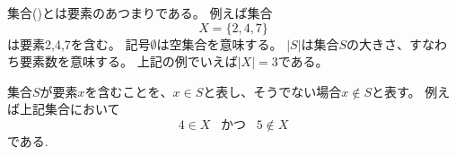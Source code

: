 
\begin{comment}
A \key{set} is a collection of elements.
For example, the set
\[X=\{2,4,7\}\]
contains elements 2, 4 and 7.
The symbol $\emptyset$ denotes an empty set,
and $|S|$ denotes the size of a set $S$,
i.e., the number of elements in the set.
For example, in the above set, $|X|=3$.
\end{comment}

集合()とは要素のあつまりである。
例えば集合
\[X=\{2,4,7\}\]
は要素2,4,7を含む。
記号$\emptyset$は空集合を意味する。
$|S|$は集合$S$の大きさ、すなわち要素数を意味する。
上記の例でいえば$|X|=3$である。

\begin{comment}
If a set $S$ contains an element $x$,
we write $x \in S$,
and otherwise we write $x \notin S$.
For example, in the above set
\[4 \in X \hspace{10pt}\textrm{and}\hspace{10pt} 5 \notin X.\]
\end{comment}

集合$S$が要素$x$を含むことを、$x \in S$と表し、そうでない場合$x \notin S$と表す。
例えば上記集合において
\[ 4 \in X \hspace{10pt}\textrm{かつ}\hspace{10pt} 5 \notin X \] である.

